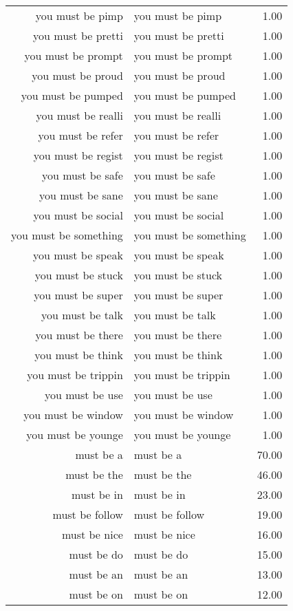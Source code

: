 \begin{table}[ht]
\begin{tabular}{rlr}
  you must be pimp & you must be pimp & 1.00 \\ 
  you must be pretti & you must be pretti & 1.00 \\ 
  you must be prompt & you must be prompt & 1.00 \\ 
  you must be proud & you must be proud & 1.00 \\ 
  you must be pumped & you must be pumped & 1.00 \\ 
  you must be realli & you must be realli & 1.00 \\ 
  you must be refer & you must be refer & 1.00 \\ 
  you must be regist & you must be regist & 1.00 \\ 
  you must be safe & you must be safe & 1.00 \\ 
  you must be sane & you must be sane & 1.00 \\ 
  you must be social & you must be social & 1.00 \\ 
  you must be something & you must be something & 1.00 \\ 
  you must be speak & you must be speak & 1.00 \\ 
  you must be stuck & you must be stuck & 1.00 \\ 
  you must be super & you must be super & 1.00 \\ 
  you must be talk & you must be talk & 1.00 \\ 
  you must be there & you must be there & 1.00 \\ 
  you must be think & you must be think & 1.00 \\ 
  you must be trippin & you must be trippin & 1.00 \\ 
  you must be use & you must be use & 1.00 \\ 
  you must be window & you must be window & 1.00 \\ 
  you must be younge & you must be younge & 1.00 \\ 
  must be a & must be a & 70.00 \\ 
  must be the & must be the & 46.00 \\ 
  must be in & must be in & 23.00 \\ 
  must be follow & must be follow & 19.00 \\ 
  must be nice & must be nice & 16.00 \\ 
  must be do & must be do & 15.00 \\ 
  must be an & must be an & 13.00 \\ 
  must be on & must be on & 12.00 \\ 

\end{tabular}
\end{table}
